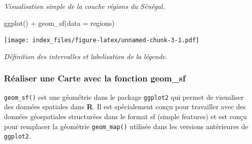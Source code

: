 \documentclass[
]{article}
\newenvironment{Shaded}{\begin{snugshade}}{\end{snugshade}}
\newcommand{\AttributeTok}[1]{\textcolor[rgb]{0.77,0.63,0.00}{#1}}
\newcommand{\ConstantTok}[1]{\textcolor[rgb]{0.00,0.00,0.00}{#1}}
\newcommand{\DecValTok}[1]{\textcolor[rgb]{0.00,0.00,0.81}{#1}}
\newcommand{\FunctionTok}[1]{\textcolor[rgb]{0.00,0.00,0.00}{#1}}
\newcommand{\NormalTok}[1]{#1}
\newcommand{\OtherTok}[1]{\textcolor[rgb]{0.56,0.35,0.01}{#1}}
\newcommand{\SpecialCharTok}[1]{\textcolor[rgb]{0.00,0.00,0.00}{#1}}
\newcommand{\StringTok}[1]{\textcolor[rgb]{0.31,0.60,0.02}{#1}}
\begin{document}
\emph{Visualisation simple de la couche régions du Sénégal.}

\begin{Shaded}
\begin{Highlighting}[]
\FunctionTok{ggplot}\NormalTok{() }\SpecialCharTok{+}
  \FunctionTok{geom\_sf}\NormalTok{(}\AttributeTok{data =}\NormalTok{ regions)}
\end{Highlighting}
\end{Shaded}

\texttt{[image: index\_files/figure-latex/unnamed-chunk-3-1.pdf]}

\emph{Définition des intervalles et labelisation de la légende.}

\begin{Shaded}
\end{Shaded}

\hypertarget{ruxe9aliser-une-carte-avec-la-fonction-geom_sf}{%
\subsubsection{\texorpdfstring{Réaliser une Carte avec la fonction
\textbf{geom\_sf}}{Réaliser une Carte avec la fonction geom\_sf}}\label{ruxe9aliser-une-carte-avec-la-fonction-geom_sf}}

\texttt{geom\_sf()} est une géométrie dans le package \texttt{ggplot2}
qui permet de visualiser des données spatiales dans \textbf{R}. Il est
spécialement conçu pour travailler avec des données géospatiales
structurées dans le format sf (simple features) et est conçu pour
remplacer la géométrie \texttt{geom\_map()} utilisée dans les versions
antérieures de \texttt{ggplot2}.
\end{document}
